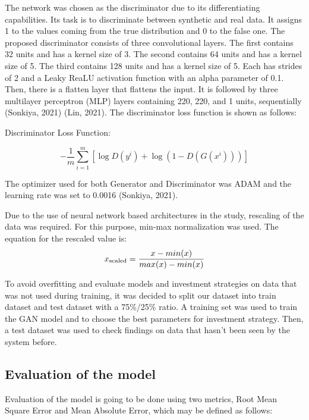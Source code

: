 \documentclass[11pt]{article} %
\begin{document}
The network was chosen as the discriminator due to its differentiating capabilities. Its task is to discriminate between synthetic and real data. It assigns 1 to the values coming from the true distribution and 0 to the false one. 
The proposed discriminator consists of three convolutional layers. The first contains 32 units and has a kernel size of 3. The second contains 64 units and has a kernel size of 5. The third contains 128 units and has a kernel size of 5. Each has strides of 2 and a Leaky ReaLU activation function with an alpha parameter of 0.1. Then, there is a flatten layer that flattens the input. It is followed by three multilayer perceptron (MLP) layers containing 220, 220, and 1 units, sequentially (Sonkiya, 2021) (Lin, 2021). 
The discriminator loss function is shown as follows: 
\begin{center}  Discriminator Loss Function: \end{center}
\begin{equation}
-\frac{1}{m} \sum_{i=1}^{m}\left[\log D\left(y^{i}\right)+\log \left(1-D\left(G\left(x^{i}\right)\right)\right)\right]
\end{equation}

The optimizer used for both Generator and Discriminator was ADAM and the learning rate was set to 0.0016 (Sonkiya, 2021).

Due to the use of neural network based architectures in the study, rescaling of the data was required. For this purpose, min-max normalization was used. The equation for the rescaled value is: 
\begin{equation} x\textsubscript{scaled} = \frac{x - min(x)}{max(x) - min(x)} \end{equation}

To avoid overfitting and evaluate models and investment strategies on data that was not used during training, it was decided to split our dataset into train dataset and test dataset with a 75\%/25\% ratio. A training set was used to train the GAN model and to choose the best parameters for investment strategy. Then, a test dataset was used to check findings on data that hasn't been seen by the system before.

\subsection{Evaluation of the model}

Evaluation of the model is going to be done using two metrics, Root Mean Square Error and Mean Absolute Error, which may be defined as follows:  \\ 
\end{document}
